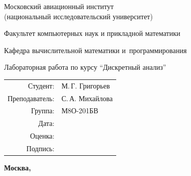 \begin{titlepage}
\begin{center}
\bfseries

{\Large Московский авиационный институт\\ (национальный исследовательский университет)

}

\vspace{48pt}

{\large Факультет компьютерных наук и прикладной математики
}

\vspace{36pt}

{\large Кафедра вычислительной математики и~программирования

}


\vspace{48pt}

Лабораторная работа  по курсу \enquote{Дискретный анализ}

\end{center}

\vspace{72pt}

\begin{flushright}
\begin{tabular}{rl}
Студент: & М.\,Г. Григорьев \\
Преподаватель: & С.\,А. Михайлова \\
Группа: & М8О-201БВ \\
Дата: & \\
Оценка: & \\
Подпись: & \\
\end{tabular}
\end{flushright}

\vfill

\begin{center}
\bfseries
Москва, \the\year
\end{center}
\end{titlepage}

\pagebreak
